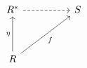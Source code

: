 \[\begin{tikzcd}
	{R^{*}} && S \\
	\\
	R
	\arrow["\eta", from=3-1, to=1-1]
	\arrow["f"', from=3-1, to=1-3]
	\arrow[dashed, from=1-1, to=1-3]
\end{tikzcd}\]